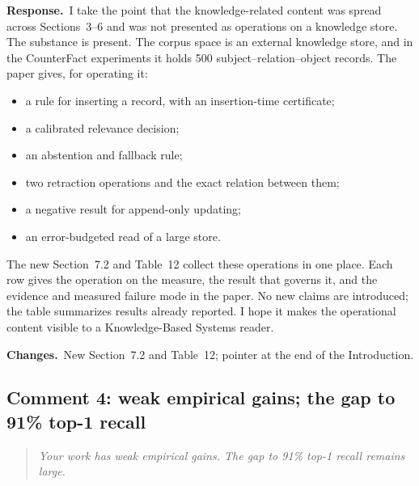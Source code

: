 \documentclass[11pt]{article}
\newenvironment{reviewer}{\par\medskip\noindent\begin{quote}\itshape}{\end{quote}}
\newcommand{\response}{\par\noindent\textbf{Response.}\ }
\newcommand{\changes}{\par\smallskip\noindent\textbf{Changes.}\ }
\begin{document}
\response I take the point that the knowledge-related content was spread across Sections~3--6 and was not presented as operations on a knowledge store. The substance is present. The corpus space is an external knowledge store, and in the CounterFact experiments it holds 500 subject--relation--object records. The paper gives, for operating it:
\begin{itemize}
\item a rule for inserting a record, with an insertion-time certificate;
\item a calibrated relevance decision;
\item an abstention and fallback rule;
\item two retraction operations and the exact relation between them;
\item a negative result for append-only updating;
\item an error-budgeted read of a large store.
\end{itemize}
The new Section~7.2 and Table~12 collect these operations in one place. Each row gives the operation on the measure, the result that governs it, and the evidence and measured failure mode in the paper. No new claims are introduced; the table summarizes results already reported. I hope it makes the operational content visible to a Knowledge-Based Systems reader.

\changes New Section~7.2 and Table~12; pointer at the end of the Introduction.

\subsection*{Comment 4: weak empirical gains; the gap to 91\% top-1 recall}

\begin{reviewer}
Your work has weak empirical gains. The gap to 91\% top-1 recall remains large.
\end{reviewer}
\end{document}
